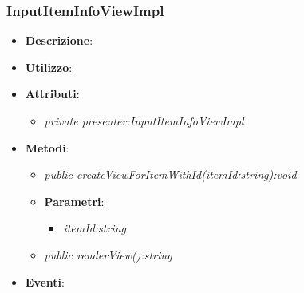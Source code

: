 \subsubsection{InputItemInfoViewImpl}
\begin{itemize}
\item \textbf{Descrizione}: 
\item \textbf{Utilizzo}:
\item \textbf{Attributi}: 
	\begin{itemize}
	\item \textit{private presenter:InputItemInfoViewImpl}\\
	
	\end{itemize}
\item \textbf{Metodi}:
	\begin{itemize}
	\item \textit{public createViewForItemWithId(itemId:string):void}\\

			\item{\textbf{Parametri}: \begin{itemize}
			\item \textit{itemId:string}\\

			\end{itemize}}
	\item \textit{public renderView():string}\\

	\end{itemize}
\item \textbf{Eventi}:
\end{itemize}

